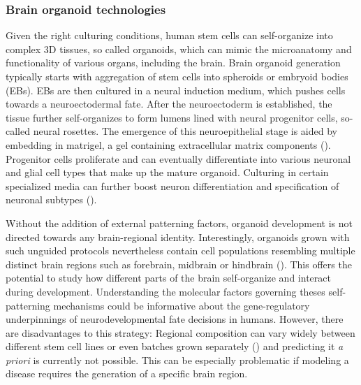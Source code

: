 
\subsubsection{Brain organoid technologies}
Given the right culturing conditions, human stem cells can self-organize into complex 3D tissues, so called organoids, which can mimic the microanatomy and functionality of various organs, including the brain. Brain organoid generation typically starts with aggregation of stem cells into spheroids or embryoid bodies (EBs). EBs are then cultured in a neural induction medium, which pushes cells towards a neuroectodermal fate. After the neuroectoderm is established, the tissue further self-organizes to form lumens lined with neural progenitor cells, so-called neural rosettes. The emergence of this neuroepithelial stage is aided by embedding in matrigel, a gel containing extracellular matrix components (\cite{lancaster_cerebral_2013,eiraku_self-organizing_2011}). Progenitor cells proliferate and can eventually differentiate into various neuronal and glial cell types that make up the mature organoid. Culturing in certain specialized media can further boost neuron differentiation and specification of neuronal subtypes (\cite{bardy_neuronal_2015}). 

Without the addition of external patterning factors, organoid development is not directed towards any brain-regional identity. Interestingly, organoids grown with such unguided protocols nevertheless contain cell populations resembling multiple distinct brain regions such as forebrain, midbrain or hindbrain (\cite{lancaster_cerebral_2013,kadoshima_self-organization_2013}). This offers the potential to study how different parts of the brain self-organize and interact during development. Understanding the molecular factors governing theses self-patterning mechanisms could be 
informative about the gene-regulatory underpinnings of neurodevelopmental fate decisions in humans. However, there are disadvantages to this strategy: Regional composition can vary widely between different stem cell lines or even batches grown separately (\cite{kanton_organoid_2019}) and predicting it \textit{a priori} is currently not possible. This can be especially problematic if modeling a disease requires the generation of a specific brain region.

